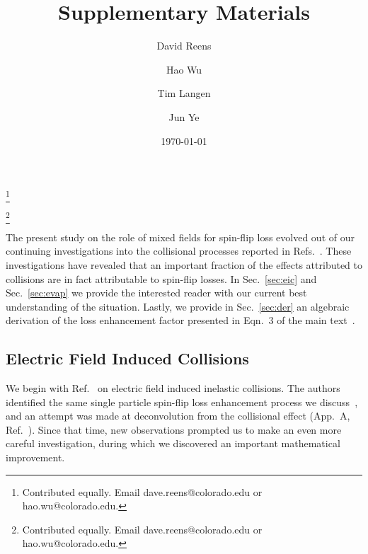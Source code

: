 \documentclass[%
 reprint,
 amsmath,amssymb,
 aps,
pra,
]{revtex4-1}
\begin{document}

\title{Supplementary Materials}%

\author{David Reens}
\thanks{Contributed equally. Email dave.reens@colorado.edu or hao.wu@colorado.edu.}

\author{Hao Wu}
\thanks{Contributed equally. Email dave.reens@colorado.edu or hao.wu@colorado.edu.}

\author{Tim Langen}%

\author{Jun Ye}


\date{\today}
\maketitle

\renewcommand{\thefigure}{S\arabic{figure}}
\setcounter{figure}{0}


The present study on the role of mixed fields for spin-flip loss evolved out of our continuing investigations into the collisional processes reported in Refs.~\cite{Stuhl2013,Stuhl2012evap}.
These investigations have revealed that an important fraction of the effects attributed to collisions are in fact attributable to spin-flip losses.
In Sec.~\ref{sec:eic} and Sec.~\ref{sec:evap} we provide the interested reader with our current best understanding of the situation.
Lastly, we provide in Sec.~\ref{sec:der} an algebraic derivation of the loss enhancement factor presented in Eqn.~3 of the main text~\cite{smt}.

\subsection{Electric Field Induced Collisions\label{sec:eic}}

We begin with Ref.~\cite{Stuhl2013} on electric field induced inelastic collisions. 
The authors identified the same single particle spin-flip loss enhancement process we discuss~\cite{smt}, and an attempt was made at deconvolution from the collisional effect (App.~A, Ref.~\cite{Stuhl2013}).
Since that time, new observations prompted us to make an even more careful investigation, during which we discovered an important mathematical improvement.
\end{document}
